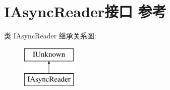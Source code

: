 \hypertarget{interface_i_async_reader}{}\section{I\+Async\+Reader接口 参考}
\label{interface_i_async_reader}
类 I\+Async\+Reader 继承关系图\+:\begin{figure}[H]
\begin{center}
\leavevmode
\includegraphics[height=2.000000cm]{interface_i_async_reader}
\end{center}
\end{figure}
